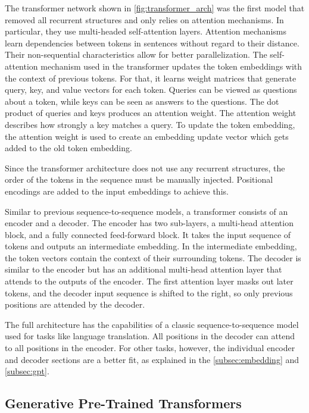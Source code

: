 \documentclass[../main.tex]{subfiles}
\begin{document}
The transformer network \cite{Vaswani2017}
shown in \autoref{fig:transformer_arch}
was the first model that removed all recurrent structures
and only relies on attention mechanisms.
In particular,
they use multi-headed self-attention layers.
Attention mechanisms learn dependencies between tokens in sentences
without regard to their distance.
Their non-sequential characteristics allow for better parallelization.
The self-attention mechanism used in the transformer updates the token embeddings
with the context of previous tokens.
For that, it learns weight matrices that generate query, key,
and value vectors for each token.
Queries can be viewed as questions about a token, while keys can be seen as answers
to the questions.
The dot product of queries and keys produces an attention weight.
The attention weight describes how strongly a key matches a query.
To update the token embedding,
the attention weight is used to create an embedding
update vector which gets added to the old token embedding.


Since the transformer architecture does not use any recurrent structures,
the order of the tokens in the sequence must be manually injected.
Positional encodings are added to the input embeddings to achieve this.

Similar to previous sequence-to-sequence models,
a transformer consists of an encoder and a decoder.
The encoder has two sub-layers,
a multi-head attention block, and a fully connected feed-forward block.
It takes the input sequence of tokens and outputs an intermediate embedding.
In the intermediate embedding,
the token vectors contain the context of their surrounding tokens.
The decoder is similar to the encoder
but has an additional multi-head attention layer
that attends to the outputs of the encoder.
The first attention layer masks out later tokens,
and the decoder input sequence is shifted to the right,
so only previous positions are attended by the decoder.

The full architecture has the capabilities of a classic sequence-to-sequence model
used for tasks like language translation.
All positions in the decoder can attend to all positions in the encoder.
For other tasks, however,
the individual encoder and decoder sections are a better fit,
as explained in the \autoref{subsec:embedding} and \autoref{subsec:gpt}.

\subsection{Generative Pre-Trained Transformers}
\label{subsec:gpt}
\end{document}
